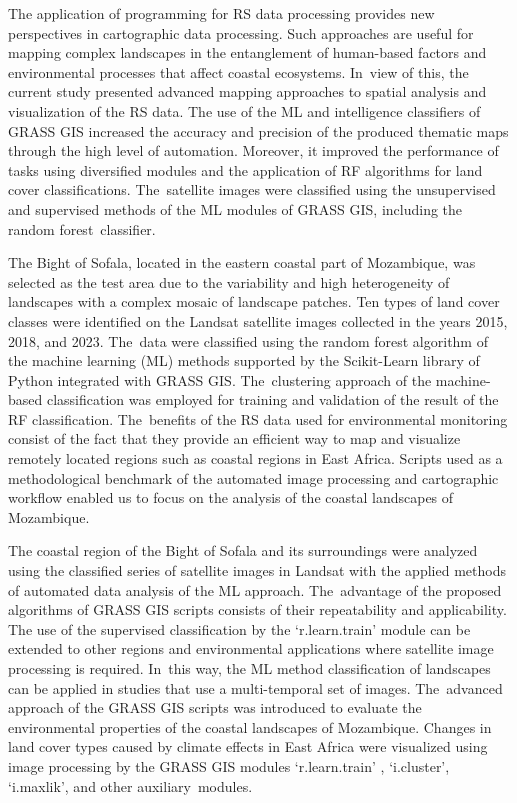 \documentclass[coasts,article,accept,pdftex,oneauthor]{Definitions/mdpi}
\begin{document}
{{The application of }programming for {RS} data processing {provides} new perspectives {in} cartographic data processing. {Such} approaches are useful for mapping complex landscapes in the entanglement of human-based factors and environmental processes that affect coastal ecosystems. In~view of this, the current study presented advanced mapping approaches to spatial analysis and {visualization} of {the RS} data}. {The} use of the ML and intelligence classifiers of GRASS GIS increased the accuracy and precision of the produced thematic maps through the high level of automation. {Moreover, it} improved the performance of tasks using diversified modules and the application of RF algorithms for {land cover} classifications. {The}~{satellite }images were classified using {the }unsupervised and supervised{ }methods of the ML modules of GRASS GIS, including the random forest~classifier. 

The Bight of Sofala, located in the eastern coastal part of Mozambique, was {selected} as the test area {due to the variability {and} high heterogeneity of landscapes with a complex mosaic of landscape patches}. Ten types of land cover classes were identified on the {Landsat satellite }images {collected in the years 2015, 2018, and 2023. The~data were }classified using {the} random forest algorithm of the machine learning (ML) methods supported by the Scikit-Learn library of Python integrated with GRASS GIS. The~clustering approach of the machine-based classification was {employed} for training and validation of the result of {the} RF classification. The~{benefits} of the{ }{RS} data{ used }for environmental monitoring {consist of the fact} that {they} provide an efficient way to map and visualize remotely located regions{ }such as coastal regions in East Africa. Scripts{ }used as a{ }methodological benchmark of {the} automated image processing and cartographic workflow enabled us to focus on the analysis of the coastal landscapes of Mozambique{.} 

The coastal region of the Bight of Sofala and {its }surroundings were analyzed {using} the classified series of {satellite }images in {Landsat with the applied methods of }automated data analysis of the ML approach. The~{advantage of the }proposed algorithms of GRASS GIS scripts {consists of their repeatability and applicability. }{The use of the }supervised classification by the `r.learn.train' module can be{ }extended to other regions and environmental applications where satellite image processing is required{. In~this way, the {ML} method} classification of landscapes{{ }can be applied in{ }studies that use} a multi-temporal set of{ }images. The~advanced approach of the GRASS GIS scripts was introduced to evaluate the environmental properties of the coastal landscapes of Mozambique{. }Changes in land cover types caused by climate effects in East Africa were visualized using image processing by the GRASS GIS modules  `r.learn.train' , `i.cluster', `i.maxlik', and other auxiliary~modules. 
\end{document}
